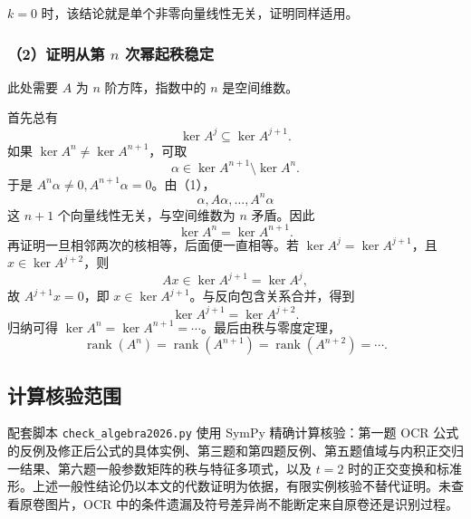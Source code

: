 \documentclass[11pt,fontset=fandol]{ctexart}
\begin{document}
\(k=0\) 时，该结论就是单个非零向量线性无关，证明同样适用。

\subsubsection{\texorpdfstring{（2）证明从第 \(n\)
次幂起秩稳定}{（2）证明从第 n 次幂起秩稳定}}\label{ux8bc1ux660eux4eceux7b2c-n-ux6b21ux5e42ux8d77ux79e9ux7a33ux5b9a}

此处需要 \(A\) 为 \(n\) 阶方阵，指数中的 \(n\) 是空间维数。

首先总有 \[
\ker A^j\subseteq\ker A^{j+1}.
\] 如果 \(\ker A^n\neq\ker A^{n+1}\)，可取 \[
\alpha\in\ker A^{n+1}\setminus\ker A^n.
\] 于是 \(A^n\alpha\neq0,A^{n+1}\alpha=0\)。由（1）， \[
\alpha,A\alpha,\ldots,A^n\alpha
\] 这 \(n+1\) 个向量线性无关，与空间维数为 \(n\) 矛盾。因此 \[
\ker A^n=\ker A^{n+1}.
\] 再证明一旦相邻两次的核相等，后面便一直相等。若
\(\ker A^j=\ker A^{j+1}\)，且 \(x\in\ker A^{j+2}\)，则 \[
Ax\in\ker A^{j+1}=\ker A^j,
\] 故 \(A^{j+1}x=0\)，即 \(x\in\ker A^{j+1}\)。与反向包含关系合并，得到
\[
\ker A^{j+1}=\ker A^{j+2}.
\] 归纳可得 \(\ker A^n=\ker A^{n+1}=\cdots\)。最后由秩与零度定理， \[
\boxed{\operatorname{rank}(A^n)=\operatorname{rank}(A^{n+1})
=\operatorname{rank}(A^{n+2})=\cdots.}
\]

\subsection{计算核验范围}\label{ux8ba1ux7b97ux6838ux9a8cux8303ux56f4}

配套脚本 \texttt{check\_algebra2026.py} 使用 SymPy 精确计算核验：第一题
OCR
公式的反例及修正后公式的具体实例、第三题和第四题反例、第五题值域与内积正交归一结果、第六题一般参数矩阵的秩与特征多项式，以及
\(t=2\)
时的正交变换和标准形。上述一般性结论仍以本文的代数证明为依据，有限实例核验不替代证明。未查看原卷图片，OCR
中的条件遗漏及符号差异尚不能断定来自原卷还是识别过程。
\end{document}
